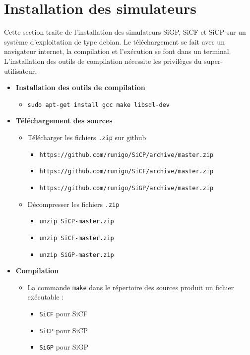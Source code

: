 \section{Installation des simulateurs}
Cette section traite de l'installation des simulateurs SiGP, SiCF et SiCP sur un système d'exploitation de type debian. Le téléchargement se fait avec un navigateur internet, la compilation et l'exécution se font dans un terminal. L'installation des outils de compilation nécessite les privilèges du super-utilisateur.
\begin{itemize}[leftmargin=1cm, label=, itemsep=0pt]
\item {\bf Installation des outils de compilation}
	\begin{itemize}[leftmargin=1cm, label=, itemsep=0pt]
	\item \texttt{sudo apt-get install gcc make libsdl-dev}
	\end{itemize}
\item {\bf Téléchargement des sources}
	\begin{itemize}[leftmargin=1cm, label=, itemsep=0pt]
	\item Télécharger les fichiers \texttt{.zip} sur github
		\begin{itemize}[leftmargin=1cm, label=, itemsep=0pt]
		\item \texttt{https://github.com/runigo/SiCP/archive/master.zip}
		\item \texttt{https://github.com/runigo/SiCF/archive/master.zip}
		\item \texttt{https://github.com/runigo/SiGP/archive/master.zip}
		\end{itemize}
	\item Décompresser les fichiers \texttt{.zip}
		\begin{itemize}[leftmargin=1cm, label=, itemsep=0pt]
		\item \texttt{unzip SiCP-master.zip}
		\item \texttt{unzip SiCF-master.zip}
		\item \texttt{unzip SiGP-master.zip}
		\end{itemize}
	\end{itemize}
\item {\bf Compilation}
	\begin{itemize}[leftmargin=1cm, label=, itemsep=0pt]
	\item La commande \texttt{make} dans le répertoire des sources produit un fichier exécutable :
		\begin{itemize}[leftmargin=1cm, label=, itemsep=0pt]
		\item \texttt{SiCF} pour SiCF
		\item \texttt{SiCP} pour SiCP
		\item \texttt{SiGP} pour SiGP
		\end{itemize}
	\end{itemize}


\end{itemize}
